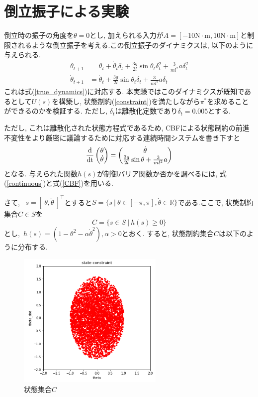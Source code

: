 \documentclass{jsarticle}
\newcommand{\odif}[2]{\frac{\rm{d}#1}{\rm{d}#2}}
\begin{document}
\section{倒立振子による実験}
倒立時の振子の角度を$\theta=0$とし, 加えられる入力が$A=[-10\textrm{N}\cdot\textrm{m},10\textrm{N}\cdot\textrm{m}]$と制限されるような倒立振子を考える.この倒立振子のダイナミクスは, 以下のように与えられる.
\begin{align}
	\theta_{t+1} &= \theta_t+\dot{\theta}_t\delta_t+\frac{3g}{2l}\sin{\theta_t}\delta_t^2+\frac{3}{ml^2}a\delta_t^2 \\
	\dot{\theta}_{t+1} &=  \dot{\theta}_t+\frac{3g}{2l}\sin{\theta_t}\delta_t+\frac{3}{ml^2}a\delta_t
\end{align}
これは式(\ref{true_dynamics})に対応する. 本実験ではこのダイナミクスが既知であるとして$U(s)$を構築し, 状態制約(\ref{constraint})を満たしながら$\pi^{*}$を求めることができるのかを検証する. ただし, $\delta_t$は離散化定数であり$\delta_t=0.005$とする.\par
ただし, これは離散化された状態方程式であるため, CBFによる状態制約の前進不変性をより厳密に議論するために対応する連続時間システムを書き下すと
\begin{equation}
	\odif{}{t}\begin{pmatrix}\theta \\ \dot{\theta}\end{pmatrix} = 
		\begin{pmatrix}\dot{\theta} \\ \frac{3g}{2l}\sin{\theta} + \frac{3}{ml^2}a \end{pmatrix} \label{continuous}
\end{equation}
となる. 与えられた関数$h(s)$が制御バリア関数か否かを調べるには, 式(\ref{continuous})と式(\ref{CBF})を用いる.\par
さて, ~$s=[~\theta, \dot{\theta}~]^{\top}$とすると$S = \{s~|~\theta\in[-\pi, \pi], \dot{\theta}\in\mathbb{R}\}$である.ここで, 状態制約集合$C\in S$を
\begin{equation}
	C=\{s\in S~|~h(s)\geq 0\}
\end{equation}とし,~$h(s)=(1-\theta^2-\alpha\dot{\theta}^2), \alpha>0$とおく. すると, 状態制約集合$C$は以下のように分布する. 
\begin{figure}[h]
	\centering
 	\includegraphics[width=7cm]{region.png}
 	\caption{状態集合$C$}
\end{figure}\\
\end{document}
